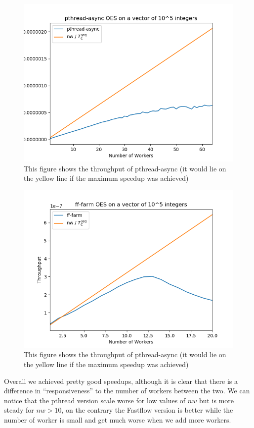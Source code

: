 \documentclass[12pt]{article}
\begin{document}
\begin{figure}[H]
  \includegraphics{pthread-async_speedup.png}
  \caption{This figure shows the throughput of pthread-async (it would
  lie on the yellow line if the maximum speedup was achieved)}
\end{figure}
\begin{figure}[H]
  \includegraphics{ff-farm_speedup.png}
  \caption{This figure shows the throughput of pthread-async (it would
  lie on the yellow line if the maximum speedup was achieved)}
\end{figure}

Overall we achieved pretty good speedups, although it is clear that
there is a difference in ``responsiveness'' to the number of workers between the two.
We can notice that the pthread version scale worse for low values of
$nw$ but is more steady for $nw > 10$, on the contrary the Fastflow
version is better while the number of worker is small and get much
worse when we add more workers.

  


  

\end{document}
